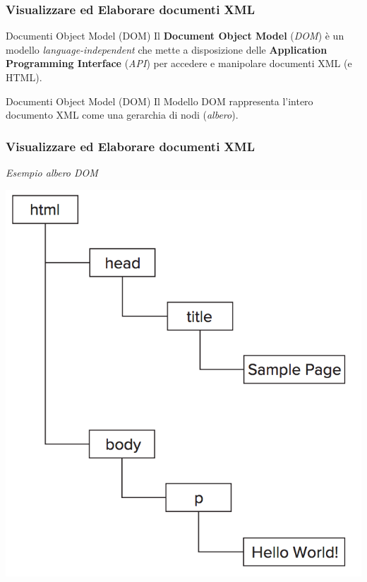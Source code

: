 \begin{frame}
    \frametitle{Visualizzare ed Elaborare documenti XML}
    \addtocounter{nframe}{1}
    

     \begin{block}{Documenti Object Model (DOM)}
        Il \textbf{Document Object Model} (\textit{DOM}) è un modello \textit{language-independent} che mette a disposizione delle \textbf{Application Programming Interface} (\textit{API}) per accedere e manipolare documenti XML (e HTML).

     \end{block}

     \begin{block}{Documenti Object Model (DOM)}
        Il Modello DOM rappresenta l'intero documento XML come una gerarchia di nodi (\textit{albero}).
     \end{block}


\end{frame}


\begin{frame}
    \frametitle{Visualizzare ed Elaborare documenti XML}
    \addtocounter{nframe}{1}
    \textit{Esempio albero DOM}    
    \begin{center}
        \includegraphics[width=.6\textwidth]{imgs/XML-DOM.png}
    \end{center}

\end{frame}

